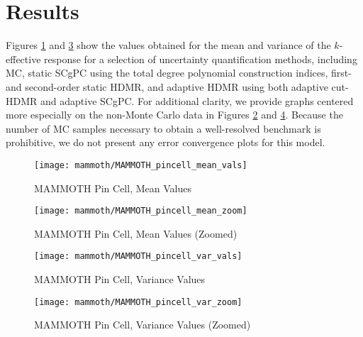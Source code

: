 \section{Results}
Figures \ref{fig:mammoth mean} and \ref{fig:mammoth var} show the values obtained for the mean and variance of
the $k$-effective response for a selection of uncertainty quantification methods, including
MC, static SCgPC using the total degree polynomial
construction indices, 
first- and second-order static HDMR,
and adaptive HDMR using both adaptive cut-HDMR and adaptive SCgPC.
 For additional clarity, we provide graphs centered more especially on the non-Monte
Carlo data in Figures \ref{fig:mammoth mean zoom} and \ref{fig:mammoth var zoom}.  Because the number of MC
samples necessary to obtain a well-resolved benchmark is prohibitive, we do not present any error
convergence plots for this model.

\begin{figure}[htb]
  \centering
  \texttt{[image: mammoth/MAMMOTH\_pincell\_mean\_vals]}
  \caption{MAMMOTH Pin Cell, Mean Values}
  \label{fig:mammoth mean}
\end{figure}
\begin{figure}[htb]
  \centering
  \texttt{[image: mammoth/MAMMOTH\_pincell\_mean\_zoom]}
  \caption{MAMMOTH Pin Cell, Mean Values (Zoomed)}
  \label{fig:mammoth mean zoom}
\end{figure}
\begin{figure}[htb]
  \centering
  \texttt{[image: mammoth/MAMMOTH\_pincell\_var\_vals]}
  \caption{MAMMOTH Pin Cell, Variance Values}
  \label{fig:mammoth var}
\end{figure}
\begin{figure}[htb]
  \centering
  \texttt{[image: mammoth/MAMMOTH\_pincell\_var\_zoom]}
  \caption{MAMMOTH Pin Cell, Variance Values (Zoomed)}
  \label{fig:mammoth var zoom}
\end{figure}

